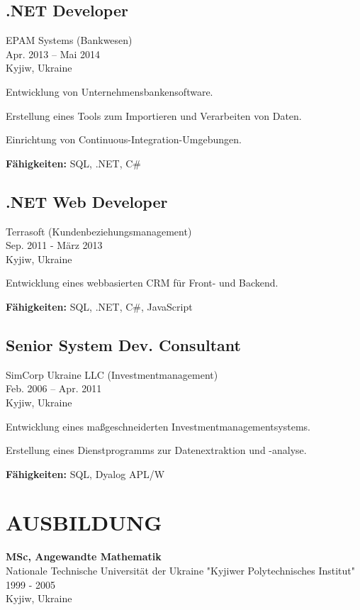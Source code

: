 \documentclass[a4paper,10pt]{article}
\begin{document}
\subsection*{.NET Developer}
EPAM Systems (Bankwesen) \\
Apr. 2013 – Mai 2014 \\
Kyjiw, Ukraine
\begin{bulletlist}
    \item Entwicklung von Unternehmensbankensoftware.
    \item Erstellung eines Tools zum Importieren und Verarbeiten von Daten.
    \item Einrichtung von Continuous-Integration-Umgebungen.
\end{bulletlist}
\textbf{Fähigkeiten:} SQL, .NET, C\#

\subsection*{.NET Web Developer}
Terrasoft (Kundenbeziehungsmanagement) \\
Sep. 2011 - März 2013 \\
Kyjiw, Ukraine
\begin{bulletlist}
    \item Entwicklung eines webbasierten CRM für Front- und Backend.
\end{bulletlist}
\textbf{Fähigkeiten:} SQL, .NET, C\#, JavaScript

\pagebreak

\subsection*{Senior System Dev. Consultant}
SimCorp Ukraine LLC (Investmentmanagement) \\
Feb. 2006 – Apr. 2011 \\
Kyjiw, Ukraine
\begin{bulletlist}
    \item Entwicklung eines maßgeschneiderten Investmentmanagementsystems.
    \item Erstellung eines Dienstprogramms zur Datenextraktion und -analyse.
\end{bulletlist}
\textbf{Fähigkeiten:} SQL, Dyalog APL/W

\section*{AUSBILDUNG}
\textbf{MSc, Angewandte Mathematik} \\
Nationale Technische Universität der Ukraine "Kyjiwer Polytechnisches Institut" \\
1999 - 2005 \\
Kyjiw, Ukraine
\end{document}
